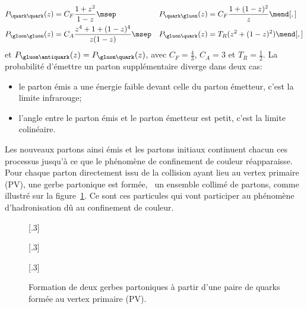 \begin{align}
P_{\quark\quark}(z) &= C_F \frac{1+z^2}{1-z} \msep&
P_{\quark\gluon}(z) &= C_F \frac{1+(1-z)^2}{z} \mend[,]
\\
P_{\gluon\gluon}(z) &= C_A \frac{z^4 + 1 + (1-z)^4}{z(1-z)} \msep&
P_{\gluon\quark}(z) &= T_R (z^2+(1-z)^2) \mend[,]
\end{align}
et $P_{\gluon\antiquark}(z) = P_{\gluon\quark}(z)$,
avec
$C_F=\frac{4}{3}$,
$C_A = 3$ et
$T_R=\frac{1}{2}$.
La probabilité d'émettre un parton supplémentaire diverge dans deux cas:
\begin{itemize}
\item le parton émis a une énergie faible devant celle du parton émetteur, c'est la limite infrarouge;
\item l'angle entre le parton émis et le parton émetteur est petit, c'est la limite colinéaire.
\end{itemize}
\par Les nouveaux partons ainsi émis et les partons initiaux continuent chacun ces processus jusqu'à ce que le phénomène de confinement de couleur réapparaisse. Pour chaque parton directement issu de la collision ayant lieu au vertex primaire (PV), une gerbe partonique est formée, \ie\ un ensemble collimé de partons, comme illustré sur la figure~\ref{fig-parton_shower}.
Ce sont ces particules qui vont participer au phénomène d'hadronisation dû au confinement de couleur.
\begin{figure}[h]
\centering
{}[.3\textwidth]
{\begin{tikzpicture}

\end{tikzpicture}}
\hfill
{}[.3\textwidth]
{\begin{tikzpicture}


\end{tikzpicture}}
\hfill
{}[.3\textwidth]
{\begin{tikzpicture}



\end{tikzpicture}}

\caption[Formation de deux gerbes partoniques.]{Formation de deux gerbes partoniques à partir d'une paire de quarks formée au vertex primaire (PV).}
\label{fig-parton_shower}
\end{figure}

